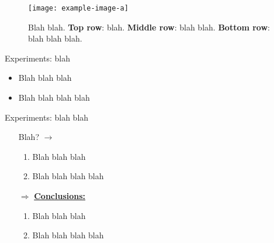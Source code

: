\documentclass{beamer}
\begin{document}
\begin{frame}[t]
\begin{minipage}[t][.8\textheight]{0.45\textwidth}
        \vfill

        \begin{figure}
            \centering
            \texttt{[image: example-image-a]}
            \caption{Blah blah. \textbf{Top row}: blah. \textbf{Middle row}: blah blah. \textbf{Bottom row}: blah blah blah.}
            \label{fig:blah}
        \end{figure}

        \vfill


        \begin{block}{Experiments: blah}
            \begin{itemize}
                \item Blah blah blah
                \item Blah blah blah blah
            \end{itemize}
        \end{block}

    \end{minipage}
    \hfill
    \begin{minipage}[t][.8\textheight]{0.45\textwidth}


        \begin{block}{Experiments: blah blah}
            \begin{itemize}
                \item[\boxed{\;?\;}] Blah? $\rightarrow$ \\
                \begin{enumerate}
                    \normalsize
                    \item Blah blah blah
                    \item Blah blah blah blah
                \end{enumerate}
                \item[$\Rightarrow$] \textbf{\underline{Conclusions:}} \\
                \begin{enumerate}
                    \normalsize
                    \item Blah blah blah
                    \item Blah blah blah blah
                \end{enumerate}
            \end{itemize}
        \end{block}


\end{minipage}
\end{frame}
\end{document}
